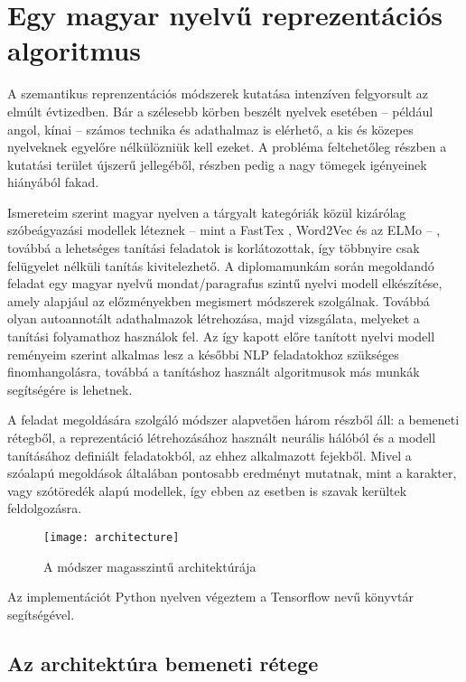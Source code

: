 \chapter{Egy magyar nyelvű reprezentációs algoritmus}
\label{ch:method}

A szemantikus reprenzentációs módszerek kutatása intenzíven felgyorsult az elmúlt évtizedben. Bár a szélesebb körben beszélt nyelvek esetében – például angol, kínai – számos technika és adathalmaz is elérhető, a kis és közepes nyelveknek egyelőre nélkülözniük kell ezeket. A probléma feltehetőleg részben a kutatási terület újszerű jellegéből, részben pedig a nagy tömegek igényeinek hiányából fakad. 

Ismereteim szerint magyar nyelven a tárgyalt kategóriák közül kizárólag szóbeágyazási modellek léteznek – mint a FastTex \cite{tex}, Word2Vec és az ELMo – , továbbá a lehetséges tanítási feladatok is korlátozottak, így többnyire csak felügyelet nélküli tanítás kivitelezhető. A diplomamunkám során megoldandó feladat egy magyar nyelvű mondat/paragrafus szintű nyelvi modell elkészítése, amely alapjául az előzményekben megismert módszerek szolgálnak. Továbbá olyan autoannotált adathalmazok létrehozása, majd vizsgálata, melyeket a tanítási folyamathoz használok fel. Az így kapott előre tanított nyelvi modell reményeim szerint alkalmas lesz a későbbi NLP feladatokhoz szükséges finomhangolásra, továbbá a tanításhoz használt algoritmusok más munkák segítségére is lehetnek.

A feladat megoldására szolgáló módszer alapvetően három részből áll: a bemeneti rétegből, a reprezentáció létrehozásához használt neurális hálóból és a modell tanításához definiált feladatokból, az ehhez alkalmazott fejekből. Mivel a szóalapú megoldások általában pontosabb eredményt mutatnak, mint a karakter, vagy szótöredék alapú modellek, így ebben az esetben is szavak kerültek feldolgozásra.

\begin{figure}[H]
	\centering
	\texttt{[image: architecture]}
	\caption{A módszer magasszintű architektúrája}
\end{figure}

Az implementációt Python nyelven végeztem a Tensorflow \cite{tensorflow} nevű könyvtár segítségével.

\section{Az architektúra bemeneti rétege}


